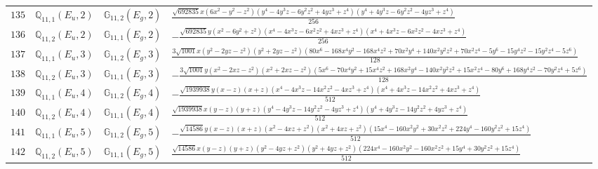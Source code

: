 \documentclass[fleqn,8pt,landscape]{jsarticle}
\begin{document}
\begin{table}[ht!]
\begin{center}
\begin{tabular}{cccl}
$ 135 $ & $ \mathbb{Q}_{11,1}(E_{u},2) $ & $ \mathbb{G}_{11,2}(E_{g},2) $ & $ \frac{\sqrt{692835} x \left(6 x^{2} - y^{2} - z^{2}\right) \left(y^{4} - 4 y^{3} z - 6 y^{2} z^{2} + 4 y z^{3} + z^{4}\right) \left(y^{4} + 4 y^{3} z - 6 y^{2} z^{2} - 4 y z^{3} + z^{4}\right)}{256} $ \\
$ 136 $ & $ \mathbb{Q}_{11,2}(E_{u},2) $ & $ \mathbb{G}_{11,1}(E_{g},2) $ & $ - \frac{\sqrt{692835} y \left(x^{2} - 6 y^{2} + z^{2}\right) \left(x^{4} - 4 x^{3} z - 6 x^{2} z^{2} + 4 x z^{3} + z^{4}\right) \left(x^{4} + 4 x^{3} z - 6 x^{2} z^{2} - 4 x z^{3} + z^{4}\right)}{256} $ \\
$ 137 $ & $ \mathbb{Q}_{11,1}(E_{u},3) $ & $ \mathbb{G}_{11,2}(E_{g},3) $ & $ \frac{3 \sqrt{1001} x \left(y^{2} - 2 y z - z^{2}\right) \left(y^{2} + 2 y z - z^{2}\right) \left(80 x^{6} - 168 x^{4} y^{2} - 168 x^{4} z^{2} + 70 x^{2} y^{4} + 140 x^{2} y^{2} z^{2} + 70 x^{2} z^{4} - 5 y^{6} - 15 y^{4} z^{2} - 15 y^{2} z^{4} - 5 z^{6}\right)}{128} $ \\
$ 138 $ & $ \mathbb{Q}_{11,2}(E_{u},3) $ & $ \mathbb{G}_{11,1}(E_{g},3) $ & $ - \frac{3 \sqrt{1001} y \left(x^{2} - 2 x z - z^{2}\right) \left(x^{2} + 2 x z - z^{2}\right) \left(5 x^{6} - 70 x^{4} y^{2} + 15 x^{4} z^{2} + 168 x^{2} y^{4} - 140 x^{2} y^{2} z^{2} + 15 x^{2} z^{4} - 80 y^{6} + 168 y^{4} z^{2} - 70 y^{2} z^{4} + 5 z^{6}\right)}{128} $ \\
$ 139 $ & $ \mathbb{Q}_{11,1}(E_{u},4) $ & $ \mathbb{G}_{11,2}(E_{g},4) $ & $ - \frac{\sqrt{1939938} y \left(x - z\right) \left(x + z\right) \left(x^{4} - 4 x^{3} z - 14 x^{2} z^{2} - 4 x z^{3} + z^{4}\right) \left(x^{4} + 4 x^{3} z - 14 x^{2} z^{2} + 4 x z^{3} + z^{4}\right)}{512} $ \\
$ 140 $ & $ \mathbb{Q}_{11,2}(E_{u},4) $ & $ \mathbb{G}_{11,1}(E_{g},4) $ & $ \frac{\sqrt{1939938} x \left(y - z\right) \left(y + z\right) \left(y^{4} - 4 y^{3} z - 14 y^{2} z^{2} - 4 y z^{3} + z^{4}\right) \left(y^{4} + 4 y^{3} z - 14 y^{2} z^{2} + 4 y z^{3} + z^{4}\right)}{512} $ \\
$ 141 $ & $ \mathbb{Q}_{11,1}(E_{u},5) $ & $ \mathbb{G}_{11,2}(E_{g},5) $ & $ - \frac{\sqrt{14586} y \left(x - z\right) \left(x + z\right) \left(x^{2} - 4 x z + z^{2}\right) \left(x^{2} + 4 x z + z^{2}\right) \left(15 x^{4} - 160 x^{2} y^{2} + 30 x^{2} z^{2} + 224 y^{4} - 160 y^{2} z^{2} + 15 z^{4}\right)}{512} $ \\
$ 142 $ & $ \mathbb{Q}_{11,2}(E_{u},5) $ & $ \mathbb{G}_{11,1}(E_{g},5) $ & $ \frac{\sqrt{14586} x \left(y - z\right) \left(y + z\right) \left(y^{2} - 4 y z + z^{2}\right) \left(y^{2} + 4 y z + z^{2}\right) \left(224 x^{4} - 160 x^{2} y^{2} - 160 x^{2} z^{2} + 15 y^{4} + 30 y^{2} z^{2} + 15 z^{4}\right)}{512} $ \\

\end{tabular}
\end{center}
\end{table}
\end{document}
